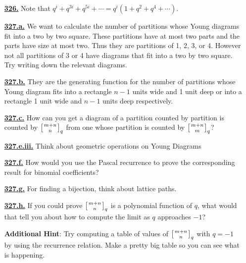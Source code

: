 \documentclass[10pt,]{book}
\theoremstyle{plain}
\theoremstyle{definition}
\theoremstyle{definition}
\theoremstyle{definition}
\numberwithin{equation}{chapter}
\newcommand{\qchoose}[2]{\left[{#1\atop#2}\right]_q}
\begin{document}
\begin{itemize}[itemsep=1em]
\hypertarget{a-326}{}\item[\textbf{\hyperref[activity-319]{326.}}]
\hypertarget{p-1611}{}%
Note that \(q^i + q^{3i} + q^{5i} + \cdots = q^i (1 + q^2 + q^4 + \cdots)\).%

\hypertarget{a-327.a}{}\item[\textbf{\hyperref[task-279]{327.a.}}]
\hypertarget{p-1615}{}%
We want to calculate the number of partitions whose Young diagrams fit into a two by two square. These partitions have at most two parts and the parts have size at most two. Thus they are partitions of 1, 2, 3, or 4. However not all partitions of 3 or 4 have diagrams that fit into a two by two square. Try writing down the relevant diagrams.%

\hypertarget{a-327.b}{}\item[\textbf{\hyperref[task-280]{327.b.}}]
\hypertarget{p-1618}{}%
They are the generating function for the number of partitions whose Young diagram fits into a rectangle \(n - 1\) units wide and 1 unit deep or into a rectangle 1 unit wide and \(n - 1\) units deep respectively.%

\hypertarget{a-327.c}{}\item[\textbf{\hyperref[task-281]{327.c.}}]
\hypertarget{p-1621}{}%
How can you get a diagram of a partition counted by partition is counted by \(\qchoose{m+n}{n}\) from one whose partition is counted by \(\qchoose{m+n}{m}\)?%

\hypertarget{a-327.e.iii}{}\item[\textbf{\hyperref[task-286]{327.e.iii.}}]
\hypertarget{p-1633}{}%
Think about geometric operations on Young Diagrams%

\hypertarget{a-327.f}{}\item[\textbf{\hyperref[task-287]{327.f.}}]
\hypertarget{p-1636}{}%
How would you use the Pascal recurrence to prove the corresponding result for binomial coefficients?%

\hypertarget{a-327.g}{}\item[\textbf{\hyperref[task-288]{327.g.}}]
\hypertarget{p-1640}{}%
For finding a bijection, think about lattice paths.%

\hypertarget{a-327.h}{}\item[\textbf{\hyperref[task-289]{327.h.}}]
\hypertarget{p-1643}{}%
If you could prove \(\qchoose{m+n}{n}\) is a polynomial function of \(q\), what would that tell you about how to compute the limit as \(q\) approaches \(-1\)?%

\par\smallskip
\noindent\textbf{Additional Hint}: \hypertarget{p-1644}{}%
Try computing a table of values of \(\qchoose{m+n}{n}\) with \(q=-1\) by using the recurrence relation. Make a pretty big table so you can see what is happening.%

\end{itemize}
\typeout{************************************************}
\typeout{************************************************}
\end{document}

